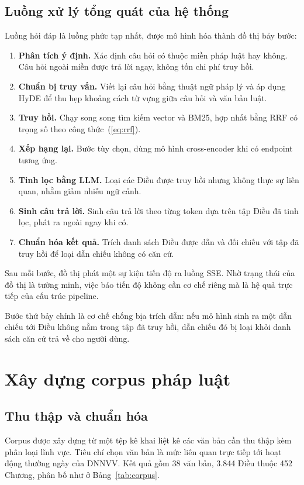 \documentclass[12pt,a4paper]{report}
\numberwithin{equation}{chapter}
\numberwithin{figure}{chapter}
\numberwithin{table}{chapter}
\newcommand{\soLuat}{38}
\newcommand{\soDieu}{3.844}
\newcommand{\soChuong}{452}
\begin{document}
\subsection{Luồng xử lý tổng quát của hệ thống}
\label{sec:pipeline}

Luồng hỏi đáp là luồng phức tạp nhất, được mô hình hóa thành đồ thị bảy bước:

\begin{enumerate}
    \item \textbf{Phân tích ý định.} Xác định câu hỏi có thuộc miền pháp luật hay
    không. Câu hỏi ngoài miền được trả lời ngay, không tốn chi phí truy hồi.
    \item \textbf{Chuẩn bị truy vấn.} Viết lại câu hỏi bằng thuật ngữ pháp lý và
    áp dụng HyDE để thu hẹp khoảng cách từ vựng giữa câu hỏi và văn bản luật.
    \item \textbf{Truy hồi.} Chạy song song tìm kiếm vector và BM25, hợp nhất
    bằng RRF có trọng số theo công thức~(\ref{eq:rrf}).
    \item \textbf{Xếp hạng lại.} Bước tùy chọn, dùng mô hình cross-encoder khi có
    endpoint tương ứng.
    \item \textbf{Tinh lọc bằng LLM.} Loại các Điều được truy hồi nhưng không
    thực sự liên quan, nhằm giảm nhiễu ngữ cảnh.
    \item \textbf{Sinh câu trả lời.} Sinh câu trả lời theo từng token dựa trên
    tập Điều đã tinh lọc, phát ra ngoài ngay khi có.
    \item \textbf{Chuẩn hóa kết quả.} Trích danh sách Điều được dẫn và đối chiếu
    với tập đã truy hồi để loại dẫn chiếu không có căn cứ.
\end{enumerate}

Sau mỗi bước, đồ thị phát một sự kiện tiến độ ra luồng SSE. Nhờ trạng thái của đồ
thị là tường minh, việc báo tiến độ không cần cơ chế riêng mà là hệ quả trực tiếp
của cấu trúc pipeline.

Bước thứ bảy chính là cơ chế chống bịa trích dẫn: nếu mô hình sinh ra một dẫn
chiếu tới Điều không nằm trong tập đã truy hồi, dẫn chiếu đó bị loại khỏi danh
sách căn cứ trả về cho người dùng.

\section{Xây dựng corpus pháp luật}
\label{sec:corpus}

\subsection{Thu thập và chuẩn hóa}
Corpus được xây dựng từ một tệp kê khai liệt kê các văn bản cần thu thập kèm phân
loại lĩnh vực. Tiêu chí chọn văn bản là mức liên quan trực tiếp tới hoạt động
thường ngày của DNNVV. Kết quả gồm \soLuat{} văn bản, \soDieu{} Điều thuộc
\soChuong{} Chương, phân bố như ở Bảng~\ref{tab:corpus}.
\end{document}
